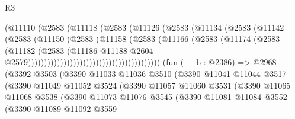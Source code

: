 \begin{lexlean}{R3}
\begin{coremodule}
                                            (@11110
                                              (@2583
                                                (@11118
                                                  (@2583
                                                    (@11126
                                                      (@2583
                                                        (@11134
                                                          (@2583
                                                            (@11142
                                                              (@2583
                                                                (@11150
                                                                  (@2583
                                                                    (@11158
                                                                      (@2583
                                                                        (@11166
                                                                          (@2583
                                                                            (@11174
                                                                              (@2583
                                                                                (@11182
                                                                                  (@2583
                                                                                    (@11186
                                                                                      @11188
                                                                                      @2604
                                                                                      @2579)))))))))))))))))))))))))))))))))))))))))
    (fun (__b : @2386) =>
    @2968
      (@3392
        @3503
        (@3390
          @11033
          @11036
          @3510
          (@3390
            @11041
            @11044
            @3517
            (@3390
              @11049
              @11052
              @3524
              (@3390
                @11057
                @11060
                @3531
                (@3390
                  @11065
                  @11068
                  @3538
                  (@3390
                    @11073
                    @11076
                    @3545
                    (@3390
                      @11081
                      @11084
                      @3552
                      (@3390
                        @11089
                        @11092
                        @3559

\end{coremodule}
\end{lexlean}
